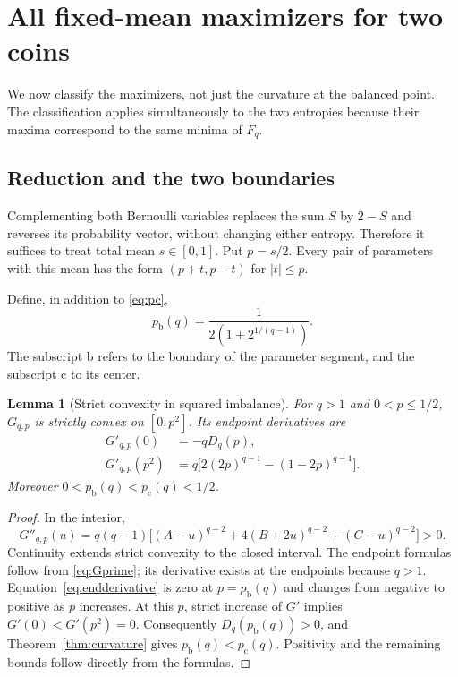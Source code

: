 \documentclass[11pt]{article}
\numberwithin{equation}{section}
\newtheorem{lemma}[theorem]{Lemma}
\theoremstyle{definition}
\theoremstyle{remark}
\newcommand{\pb}{p_{\mathrm b}}
\newcommand{\pc}{p_{\mathrm c}}
\begin{document}
\section{All fixed-mean maximizers for two coins}
We now classify the maximizers, not just the curvature at the balanced
point. The classification applies simultaneously to the two entropies
because their maxima correspond to the same minima of $F_q$.

\subsection{Reduction and the two boundaries}
Complementing both Bernoulli variables replaces the sum $S$ by $2-S$ and
reverses its probability vector, without changing either entropy. Therefore
it suffices to treat total mean $s\in[0,1]$. Put $p=s/2$. Every pair of
parameters with this mean has the form $(p+t,p-t)$ for $|t|\leq p$.

Define, in addition to \eqref{eq:pc},
\begin{equation}
 \pb(q)=\frac{1}{2(1+2^{1/(q-1)})}.\label{eq:pb}
\end{equation}
The subscript b refers to the boundary of the parameter segment, and the
subscript c to its center.

\begin{lemma}[Strict convexity in squared imbalance]\label{lem:convexu}
For $q>1$ and $0<p\leq1/2$, $G_{q,p}$ is strictly convex on $[0,p^2]$.
Its endpoint derivatives are
\begin{align}
 G'_{q,p}(0)&=-qD_q(p),\label{eq:startderivative}\\
 G'_{q,p}(p^2)&=q\bigl[2(2p)^{q-1}-(1-2p)^{q-1}\bigr].
 \label{eq:endderivative}
\end{align}
Moreover $0<\pb(q)<\pc(q)<1/2$.
\end{lemma}
\begin{proof}
In the interior,
\begin{equation}
 G''_{q,p}(u)=q(q-1)\bigl[(A-u)^{q-2}
              +4(B+2u)^{q-2}+(C-u)^{q-2}\bigr]>0.
 \label{eq:convexu}
\end{equation}
Continuity extends strict convexity to the closed interval. The endpoint
formulas follow from \eqref{eq:Gprime}; its derivative exists at the
endpoints because $q>1$. Equation~\eqref{eq:endderivative} is zero at
$p=\pb(q)$ and changes from negative to positive as $p$ increases.
At this $p$, strict increase of $G'$ implies $G'(0)<G'(p^2)=0$.
Consequently $D_q(\pb(q))>0$, and Theorem~\ref{thm:curvature} gives
$\pb(q)<\pc(q)$. Positivity and the remaining bounds follow directly from
the formulas.
\end{proof}
\end{document}
